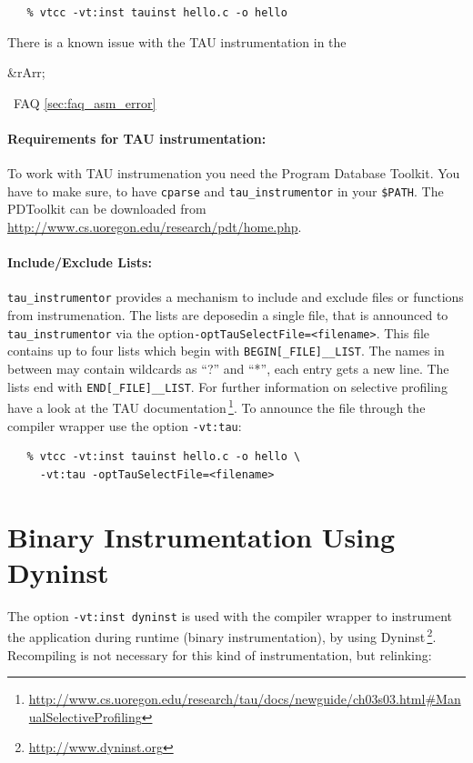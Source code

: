 \documentclass[a4paper,twoside,12pt,BCOR12mm]{scrbook}
\newcommand{\rarr}{$\Rightarrow$}  %
\renewcommand{\rarr}{\begin{rawhtml}&rArr;\end{rawhtml}}   %
\begin{document}
\vspace{1ex}
\verb|   % vtcc -vt:inst tauinst hello.c -o hello|
\vspace{1ex}

  There is a known issue with the TAU instrumentation in the \rarr~FAQ \ref{sec:faq_asm_error}
\paragraph{Requirements for TAU instrumentation:}
  To work with TAU instrumenation you need the Program Database Toolkit.
  You have to make sure, to have \texttt{cparse} and \texttt{tau\_instrumentor} in your \texttt{\$PATH}. 
  The PDToolkit can be downloaded from \url{http://www.cs.uoregon.edu/research/pdt/home.php}.
\paragraph{Include/Exclude Lists:}
  \texttt{tau\_instrumentor} provides a mechanism to include and exclude files or functions
  from instrumenation. The lists are deposed\linebreak in a single file, that 
  is announced to \texttt{tau\_instrumentor} via the option\linebreak \texttt{-optTauSelectFile=<filename>}.
  This file contains up to four lists which begin with \texttt{BEGIN[\_FILE]\_<INCLUDE|EXCLUDE>\_LIST}.
  The names in between may contain wildcards as ``?'' and ``*'', each entry gets a new line.
  The lists end with \texttt{END[\_FILE]\_<INCLUDE|EXCLUDE>\_LIST}. For further information on selective 
  profiling have a look at the TAU documentation\,\footnote{\url{http://www.cs.uoregon.edu/research/tau/docs/newguide/ch03s03.html\#ManualSelectiveProfiling}}.
  To announce the file through the compiler wrapper use the option \texttt{-vt:tau}:
\begin{verbatim}
   % vtcc -vt:inst tauinst hello.c -o hello \
     -vt:tau -optTauSelectFile=<filename>
\end{verbatim}
\section{Binary Instrumentation Using Dyninst}
\label{sec:dyninst}

The option \texttt{-vt:inst dyninst} is used with the compiler wrapper to 
instrument the application during runtime (binary instrumentation), by using 
Dyninst\,\footnote{\url{http://www.dyninst.org}}.
Recompiling is not necessary for this kind of instrumentation,
but relinking:
\end{document}
